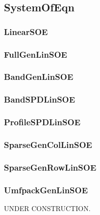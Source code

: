 \pagebreak
\subsection{{\bf SystemOfEqn}}


\pagebreak
\subsubsection{{\bf LinearSOE}}


\pagebreak
\subsubsection{FullGenLinSOE}


\pagebreak
\subsubsection{BandGenLinSOE}


\pagebreak
\subsubsection{BandSPDLinSOE}


\pagebreak
\subsubsection{ProfileSPDLinSOE}


\pagebreak
\subsubsection{SparseGenColLinSOE}


\pagebreak
\subsubsection{SparseGenRowLinSOE}
%

\pagebreak
\subsubsection{UmfpackGenLinSOE}
UNDER CONSTRUCTION. \\

